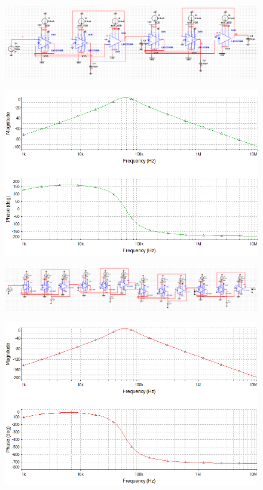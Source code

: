 \documentclass[twoside]{article}
\begin{document}
\begin{figure}[H]
\centering
\includegraphics[scale=0.5]{PP2O.png}
\end{figure}
\begin{figure}[H]
\centering
\includegraphics[scale=0.65]{PP2O2.png}
\end{figure}
\begin{figure}[H]
\centering
\includegraphics[scale=0.5]{PP4O.png}
\end{figure}
\begin{figure}[H]
\centering
\includegraphics[scale=0.65]{PP4O2.png}
\end{figure}
\end{document}
